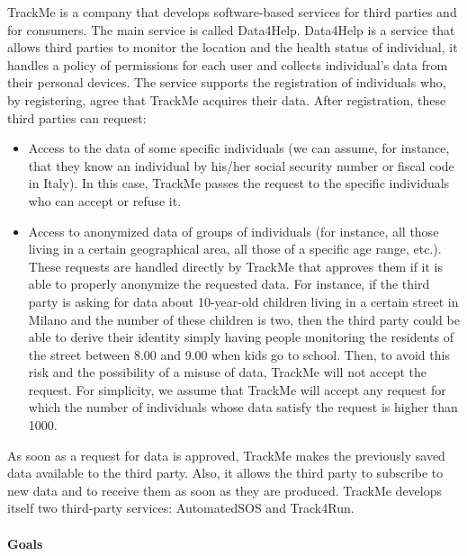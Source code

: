 \documentclass[a4paper]{article}
\begin{document}
\begin{para}

TrackMe is a company that develops software-based services for third parties and for consumers. The main service is called Data4Help.
 Data4Help is a service that allows third parties to monitor the location and the health status of individual, it handles a policy of permissions for each user and collects individual’s data from their personal devices.
The service supports the registration of individuals who, by registering, agree that TrackMe acquires their data. After registration, these third parties can request:
\begin{itemize}
    \item Access to the data of some specific individuals (we can assume, for instance, that they know an 
    individual by his/her social security number or fiscal code in Italy). In this case, TrackMe passes 
    the request to the specific individuals who can accept or refuse it.
    
    \item Access to anonymized data of groups of individuals (for instance, all those living in a certain 
    geographical area, all those of a specific age range, etc.). These requests are handled directly 
    by TrackMe that approves them if it is able to properly anonymize the requested data. For 
    instance, if the third party is asking for data about 10-year-old children living in a certain street 
    in Milano and the number of these children is two, then the third party could be able to derive 
    their identity simply having people monitoring the residents of the street between 8.00 and 
    9.00 when kids go to school. Then, to avoid this risk and the possibility of a misuse of data,
    TrackMe will not accept the request. For simplicity, we assume that TrackMe will accept any 
    request for which the number of individuals whose data satisfy the request is higher than 
    1000.

\end{itemize}

As soon as a request for data is approved, TrackMe makes the previously saved data available to the 
third party. Also, it allows the third party to subscribe to new data and to receive them as soon as 
they are produced.
TrackMe develops itself two third-party services: AutomatedSOS and Track4Run.

\end{para}

\paragraph{Goals}
\end{document}
